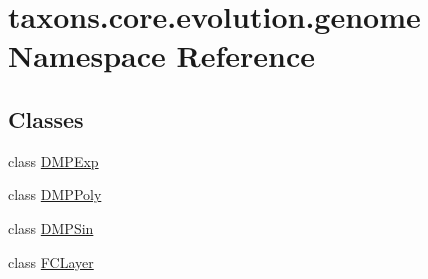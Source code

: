 \hypertarget{namespacetaxons_1_1core_1_1evolution_1_1genome}{}\section{taxons.\+core.\+evolution.\+genome Namespace Reference}
\label{namespacetaxons_1_1core_1_1evolution_1_1genome}
\subsection*{Classes}
\begin{DoxyCompactItemize}
\item 
class \hyperlink{classtaxons_1_1core_1_1evolution_1_1genome_1_1_d_m_p_exp}{D\+M\+P\+Exp}
\item 
class \hyperlink{classtaxons_1_1core_1_1evolution_1_1genome_1_1_d_m_p_poly}{D\+M\+P\+Poly}
\item 
class \hyperlink{classtaxons_1_1core_1_1evolution_1_1genome_1_1_d_m_p_sin}{D\+M\+P\+Sin}
\item 
class \hyperlink{classtaxons_1_1core_1_1evolution_1_1genome_1_1_f_c_layer}{F\+C\+Layer}
\end{DoxyCompactItemize}
